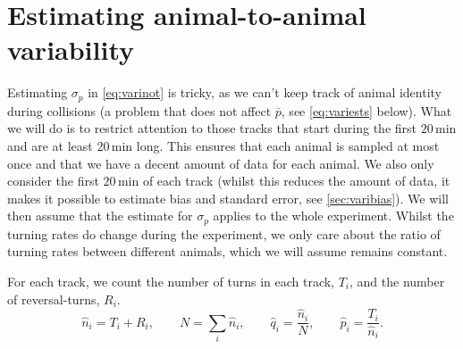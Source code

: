 \documentclass[12pt]{article}
\newcommand{\mins}[1][\,]{#1\mathrm{min}}
\begin{document}
\section{Estimating animal-to-animal variability}\label{sec:variest}

Estimating $\sigma_p$ in \eqref{eq:varinot} is tricky, as we can't keep track of animal identity during collisions (a problem that does not affect $\bar{p}$, see \eqref{eq:variests} below). What we will do is to restrict attention to those tracks that start during the first $20\mins$ and are at least $20\mins$ long. This ensures that each animal is sampled at most once and that we have a decent amount of data for each animal. We also only consider the first $20\mins$ of each track (whilst this reduces the amount of data, it makes it possible to estimate bias and standard error, see \ref{sec:varibias}). We will then assume that the estimate for $\sigma_p$ applies to the whole experiment. Whilst the turning rates do change during the experiment, we only care about the ratio of turning rates between different animals, which we will assume remains constant.

For each track, we count the number of turns in each track, $T_i$, and the number of reversal-turns, $R_i$.
%
\begin{equation}\label{eq:varesttype}
  \hat{n}_i = T_i+R_i, \qquad
  N = \sum_i \hat{n}_i, \qquad
  \hat{q}_i = \frac{\hat{n}_i}{N}, \qquad
  \hat{p}_i = \frac{T_i}{\hat{n}_i}.
\end{equation}
%

\end{document}
